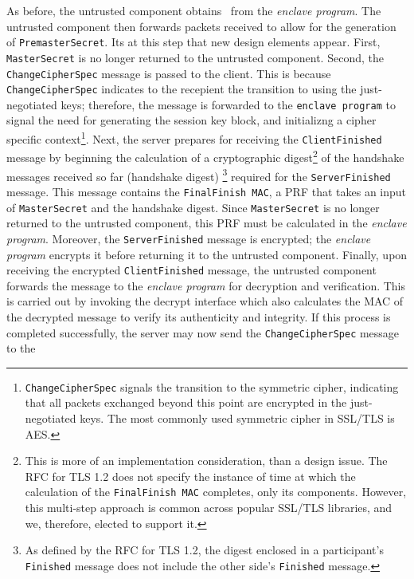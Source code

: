 \documentclass[../../main.tex]{subfiles}
\begin{document}
As before, the untrusted component obtains \srandom~from the
\textit{enclave program}. The untrusted component then forwards
packets received to allow for the generation of
\texttt{PremasterSecret}. Its at this step that new design elements
appear. First, \texttt{MasterSecret} is no longer returned to the
untrusted component. Second, the \texttt{Change\-CipherSpec} message
is passed to the client. This is because \texttt{ChangeCipherSpec}
indicates to the recepient the transition to using the just-negotiated
keys; therefore, the message is forwarded to the \texttt{enclave
  program} to signal the need for generating the session key block,
and initializng a cipher specific
context\footnote{\texttt{ChangeCipherSpec} signals the transition to
  the symmetric cipher, indicating that all packets exchanged beyond
  this point are encrypted in the just-negotiated keys. The most
  commonly used symmetric cipher in SSL/TLS is AES.}. Next, the server
prepares for receiving the \texttt{ClientFinished} message by
beginning the calculation of a cryptographic digest\footnote{This is
  more of an implementation consideration, than a design issue. The
  RFC for TLS 1.2 does not specify the instance of time at which the
  calculation of the \texttt{FinalFinish MAC} completes, only its
  components. However, this multi-step approach is common across
  popular SSL/TLS libraries, and we, therefore, elected to support
  it.} of the handshake messages received so far (handshake digest)
\footnote{As defined by the RFC for TLS 1.2, the digest enclosed in a
  participant's \texttt{Finished} message does not include the other
  side's \texttt{Finished} message.} required for the
\texttt{ServerFinished} message. This message contains the
\texttt{FinalFinish MAC}, a PRF that takes an input of
\texttt{MasterSecret} and the handshake digest. Since
\texttt{MasterSecret} is no longer returned to the untrusted
component, this PRF must be calculated in the \textit{enclave
  program}. Moreover, the \texttt{ServerFinished} message is
encrypted; the \textit{enclave program} encrypts it before returning
it to the untrusted component. Finally, upon receiving the encrypted
\texttt{ClientFinished} message, the untrusted component forwards the
message to the \textit{enclave program} for decryption and
verification. This is carried out by invoking the decrypt interface
which also calculates the MAC of the decrypted message to verify its
authenticity and integrity. If this process is completed successfully,
the server may now send the \texttt{ChangeCipherSpec} message to the
\end{document}
